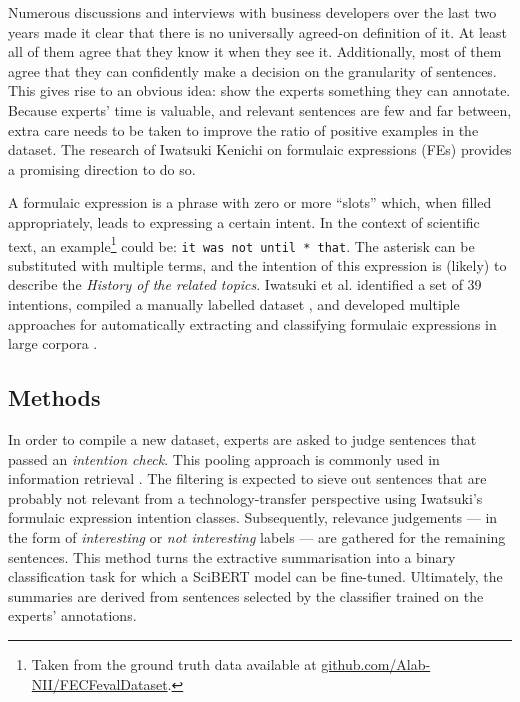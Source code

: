 Numerous discussions and interviews with business developers over the last two years made it clear that there is no universally agreed-on definition of it. At least all of them agree that they know it when they see it. Additionally, most of them agree that they can confidently make a decision on the granularity of sentences. This gives rise to an obvious idea: show the experts something they can annotate. Because experts' time is valuable, and relevant sentences are few and far between, extra care needs to be taken to improve the ratio of positive examples in the dataset. The research of Iwatsuki Kenichi on formulaic expressions (FEs) \cite{iwatsuki2020evaluation,iwatsuki2021extraction,iwatsuki2021communicative,iwatsuki2022extraction} provides a promising direction to do so. 

A formulaic expression is a phrase with zero or more ``slots'' which, when filled appropriately, leads to expressing a certain intent. In the context of scientific text, an example\footnote{Taken from the ground truth data available at \href{https://github.com/Alab-NII/FECFevalDataset/blob/master/human_evaluation/background.tsv}{github.com/Alab-NII/FECFevalDataset}.} could be: \texttt{it was not until * that}. The asterisk can be substituted with multiple terms, and the intention of this expression is (likely) to describe the \textit{History of the related topics}. Iwatsuki et al. identified a set of 39 intentions, compiled a manually labelled dataset \cite{iwatsuki2020evaluation}, and developed multiple approaches for automatically extracting and classifying formulaic expressions in large corpora \cite{iwatsuki2021communicative,iwatsuki2022extraction}.

\subsection{Methods}

In order to compile a new dataset, experts are asked to judge sentences that passed an \textit{intention check}. This pooling approach is commonly used in information retrieval \cite{schutze2008introduction}. The filtering is expected to sieve out sentences that are probably not relevant from a technology-transfer perspective using Iwatsuki's formulaic expression intention classes. Subsequently, relevance judgements --- in the form of \textit{interesting} or \textit{not interesting} labels --- are gathered for the remaining sentences. This method turns the extractive summarisation into a binary classification task for which a SciBERT model \cite{beltagy2019scibert} can be fine-tuned. Ultimately, the summaries are derived from sentences selected by the classifier trained on the experts' annotations.

